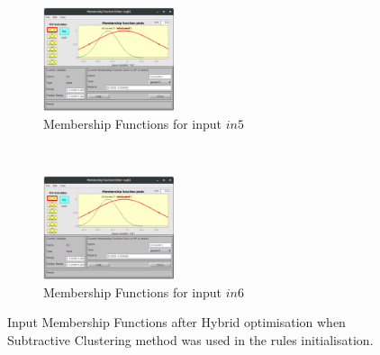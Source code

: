 \documentclass[11pt]{article}
\begin{document}
\begin{figure}[ht]
\begin{subfigure}[t]{0.3\textwidth}
		\centering
		\includegraphics[height=1.2in]{images/subtractive_hybrid_in1}
		\caption{Membership Functions for input $in5$}
	\end{subfigure}
	~
	\begin{subfigure}[t]{0.3\textwidth}
		\centering
		\includegraphics[height=1.2in]{images/subtractive_hybrid_in1}
		\caption{Membership Functions for input $in6$}
	\end{subfigure}
	\caption{Input Membership Functions after Hybrid optimisation when Subtractive Clustering method was used in the rules initialisation.}
\end{figure}

\pagebreak
\end{document}
